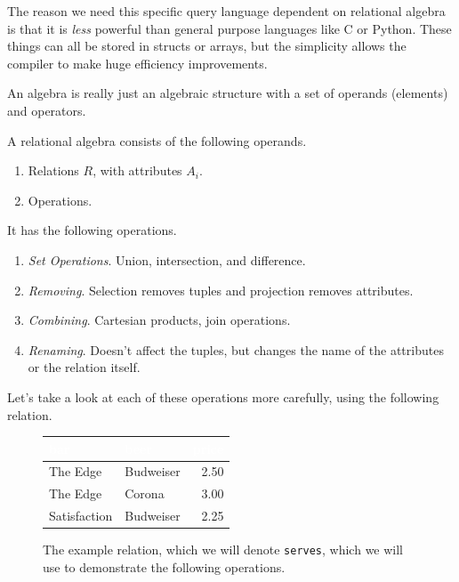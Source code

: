 \documentclass{article}
\begin{document}
    The reason we need this specific query language dependent on relational algebra is that it is \textit{less} powerful than general purpose languages like C or Python. These things can all be stored in structs or arrays, but the simplicity allows the compiler to make huge efficiency improvements. 

    An algebra is really just an algebraic structure with a set of operands (elements) and operators.  

    \begin{definition}
      A relational algebra consists of the following operands. 
      \begin{enumerate}
        \item Relations $R$, with attributes $A_i$. 
        \item Operations. 
      \end{enumerate}
      It has the following operations. 
      \begin{enumerate}
        \item \textit{Set Operations}. Union, intersection, and difference. 
        \item \textit{Removing}. Selection removes tuples and projection removes attributes. 
        \item \textit{Combining}. Cartesian products, join operations. 
        \item \textit{Renaming}. Doesn't affect the tuples, but changes the name of the attributes or the relation itself. 
      \end{enumerate}
    \end{definition}

    Let's take a look at each of these operations more carefully, using the following relation. 

    \begin{figure}[H]
      \centering
      \begin{tabular}{|l|l|r|}
      \hline
      \rowcolor[HTML]{E26B0A} 
      \textcolor{white}{\textbf{bar}} & \textcolor{white}{\textbf{beer}} & \textcolor{white}{\textbf{price}} \\ \hline
      \rowcolor[HTML]{FBCEB1}
      The Edge & Budweiser & 2.50 \\ \hline
      \rowcolor[HTML]{FBCEB1}
      The Edge & Corona & 3.00 \\ \hline
      \rowcolor[HTML]{FBCEB1}
      Satisfaction & Budweiser & 2.25 \\ \hline
      \end{tabular}
      \caption{The example relation, which we will denote \texttt{serves}, which we will use to demonstrate the following operations.} 
      \label{fig:serves}
    \end{figure}
    
\end{document}
